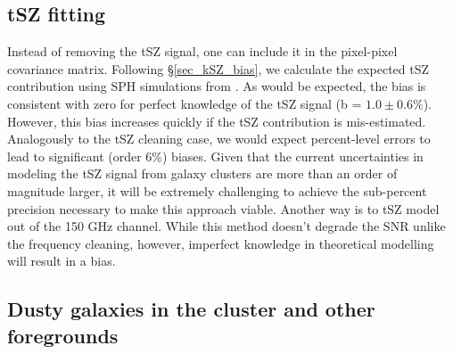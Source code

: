  \subsection{tSZ fitting}
 Instead of removing the tSZ signal, one can include it in the pixel-pixel covariance matrix.
Following \S\ref{sec_kSZ_bias}, we calculate the expected tSZ contribution using SPH simulations from \citet{mccarthy2013}.
As would be expected, the bias is consistent with zero for perfect knowledge of the tSZ signal (b = $1.0 \pm 0.6\%$).
However, this bias increases quickly if the tSZ contribution is mis-estimated.
Analogously to the tSZ cleaning case, we would expect percent-level errors to lead to significant (order 6\%) biases.
Given that the current uncertainties in modeling the tSZ signal from galaxy clusters are more than an order of magnitude larger, it will be extremely challenging to achieve the sub-percent precision necessary to make this approach viable.
Another way is to tSZ model out of the 150 GHz channel.
 While this method doesn't degrade the SNR unlike the frequency cleaning, however, imperfect knowledge in theoretical modelling will result in a bias.
 
 
 \subsection{Dusty galaxies in the cluster and other foregrounds}
\label{sec_DG_sys_bias}



